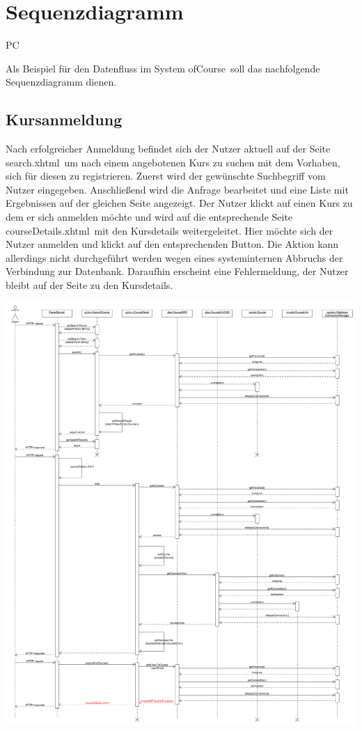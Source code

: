 \chapter{Sequenzdiagramm}

\begin{tiny}
PC
\end{tiny}

Als Beispiel für den Datenfluss im System \grqq ofCourse\grqq\ soll das nachfolgende Sequenzdiagramm dienen.

\section{Kursanmeldung}

Nach erfolgreicher Anmeldung befindet sich der Nutzer aktuell auf der Seite \grqq search.xhtml\grqq\ um nach einem angebotenen Kurs zu suchen mit dem Vorhaben, sich für diesen zu registrieren. Zuerst wird der gewünschte Suchbegriff vom Nutzer eingegeben. Anschließend wird die Anfrage bearbeitet und eine Liste mit Ergebnissen auf der gleichen Seite angezeigt. Der Nutzer klickt auf einen Kurs zu dem er sich anmelden möchte und wird auf die entsprechende Seite \grqq courseDetails.xhtml\grqq\ mit den Kursdetails weitergeleitet. Hier möchte sich der Nutzer anmelden und klickt auf den entsprechenden Button. Die Aktion kann allerdings nicht durchgeführt werden wegen eines systeminternen Abbruchs der Verbindung zur Datenbank. Daraufhin erscheint eine Fehlermeldung, der Nutzer bleibt auf der Seite zu den Kursdetails.

\includegraphics[scale=0.26]{./Grafiken/Sequenzdiagramm-Kursanmeldung.pdf}
